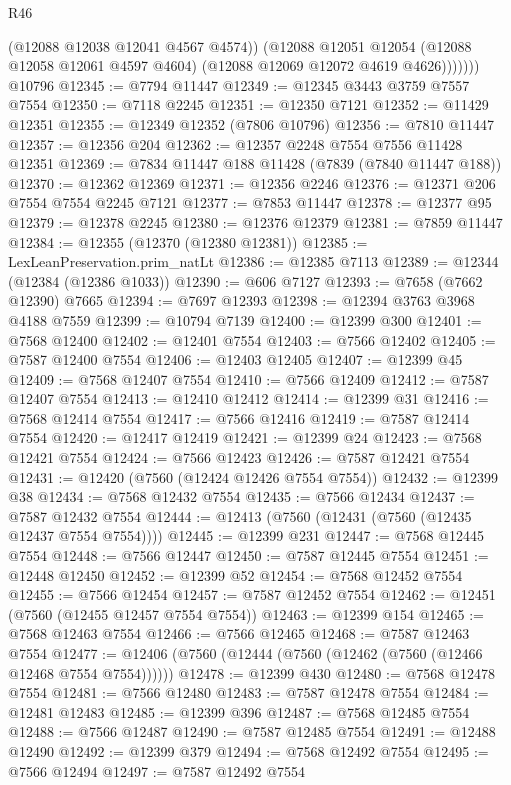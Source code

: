 \begin{lexlean}{R46}
\begin{coremodule}
                (@12088 @12038 @12041 @4567 @4574))
              (@12088
                @12051
                @12054
                (@12088 @12058 @12061 @4597 @4604)
                (@12088 @12069 @12072 @4619 @4626)))))))
    @10796
@12345 := @7794 @11447
@12349 := @12345 @3443 @3759 @7557 @7554
@12350 := @7118 @2245
@12351 := @12350 @7121
@12352 := @11429 @12351
@12355 := @12349 @12352 (@7806 @10796)
@12356 := @7810 @11447
@12357 := @12356 @204
@12362 := @12357 @2248 @7554 @7556 @11428 @12351
@12369 := @7834 @11447 @188 @11428 (@7839 (@7840 @11447 @188))
@12370 := @12362 @12369
@12371 := @12356 @2246
@12376 := @12371 @206 @7554 @7554 @2245 @7121
@12377 := @7853 @11447
@12378 := @12377 @95
@12379 := @12378 @2245
@12380 := @12376 @12379
@12381 := @7859 @11447
@12384 := @12355 (@12370 (@12380 @12381))
@12385 := LexLeanPreservation.prim_natLt
@12386 := @12385 @7113
@12389 := @12344 (@12384 (@12386 @1033))
@12390 := @606 @7127
@12393 := @7658 (@7662 @12390) @7665
@12394 := @7697 @12393
@12398 := @12394 @3763 @3968 @4188 @7559
@12399 := @10794 @7139
@12400 := @12399 @300
@12401 := @7568 @12400
@12402 := @12401 @7554
@12403 := @7566 @12402
@12405 := @7587 @12400 @7554
@12406 := @12403 @12405
@12407 := @12399 @45
@12409 := @7568 @12407 @7554
@12410 := @7566 @12409
@12412 := @7587 @12407 @7554
@12413 := @12410 @12412
@12414 := @12399 @31
@12416 := @7568 @12414 @7554
@12417 := @7566 @12416
@12419 := @7587 @12414 @7554
@12420 := @12417 @12419
@12421 := @12399 @24
@12423 := @7568 @12421 @7554
@12424 := @7566 @12423
@12426 := @7587 @12421 @7554
@12431 := @12420 (@7560 (@12424 @12426 @7554 @7554))
@12432 := @12399 @38
@12434 := @7568 @12432 @7554
@12435 := @7566 @12434
@12437 := @7587 @12432 @7554
@12444 := @12413 (@7560 (@12431 (@7560 (@12435 @12437 @7554 @7554))))
@12445 := @12399 @231
@12447 := @7568 @12445 @7554
@12448 := @7566 @12447
@12450 := @7587 @12445 @7554
@12451 := @12448 @12450
@12452 := @12399 @52
@12454 := @7568 @12452 @7554
@12455 := @7566 @12454
@12457 := @7587 @12452 @7554
@12462 := @12451 (@7560 (@12455 @12457 @7554 @7554))
@12463 := @12399 @154
@12465 := @7568 @12463 @7554
@12466 := @7566 @12465
@12468 := @7587 @12463 @7554
@12477 := @12406 (@7560 (@12444 (@7560 (@12462 (@7560 (@12466 @12468 @7554 @7554))))))
@12478 := @12399 @430
@12480 := @7568 @12478 @7554
@12481 := @7566 @12480
@12483 := @7587 @12478 @7554
@12484 := @12481 @12483
@12485 := @12399 @396
@12487 := @7568 @12485 @7554
@12488 := @7566 @12487
@12490 := @7587 @12485 @7554
@12491 := @12488 @12490
@12492 := @12399 @379
@12494 := @7568 @12492 @7554
@12495 := @7566 @12494
@12497 := @7587 @12492 @7554

\end{coremodule}
\end{lexlean}
